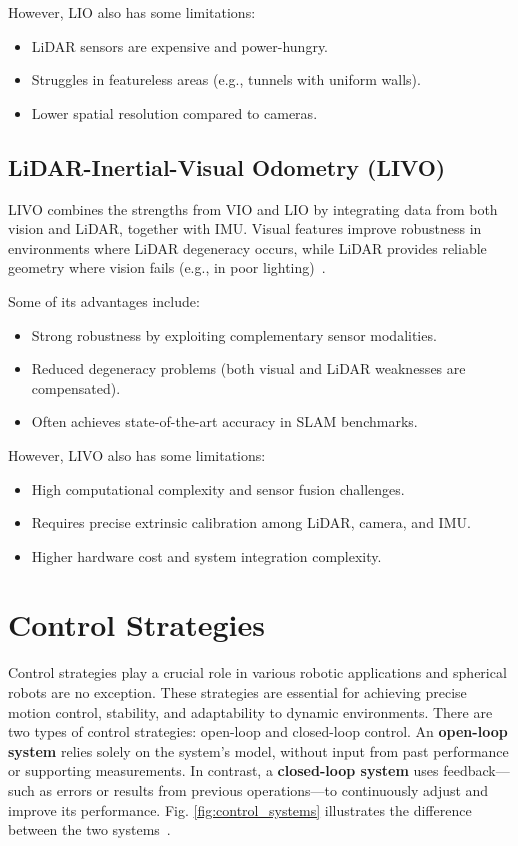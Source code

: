 \documentclass[english, bachelor, utf8]{base/thesis_telematics}
\begin{document}
However, LIO also has some limitations:
\begin{itemize}
    \item LiDAR sensors are expensive and power-hungry.
    \item Struggles in featureless areas (e.g., tunnels with uniform walls).
    \item Lower spatial resolution compared to cameras.
\end{itemize}

\subsection{LiDAR-Inertial-Visual Odometry (LIVO)}
LIVO combines the strengths from VIO and LIO by integrating data from both vision and LiDAR, together with IMU.
Visual features improve robustness in environments where LiDAR degeneracy occurs, while LiDAR provides reliable geometry where vision fails (e.g., in poor lighting)~\cite{yuan2024sr,fastlivo2}.

Some of its advantages include:
\begin{itemize}
    \item Strong robustness by exploiting complementary sensor modalities.
    \item Reduced degeneracy problems (both visual and LiDAR weaknesses are compensated).
    \item Often achieves state-of-the-art accuracy in SLAM benchmarks.
\end{itemize}

However, LIVO also has some limitations:
\begin{itemize}
    \item High computational complexity and sensor fusion challenges.
    \item Requires precise extrinsic calibration among LiDAR, camera, and IMU.
    \item Higher hardware cost and system integration complexity.
\end{itemize}

\section{Control Strategies}
\label{sec:control-strategies}
Control strategies play a crucial role in various robotic applications and spherical robots are no exception.
These strategies are essential for achieving precise motion control, stability, and adaptability to dynamic environments.
There are two types of control strategies: open-loop and closed-loop control.
An \textbf{open-loop system} relies solely on the system's model, without input from past performance or supporting measurements. In contrast, a \textbf{closed-loop system} uses feedback---such as errors or results from previous operations---to continuously adjust and improve its performance. Fig. \ref{fig:control_systems} illustrates the difference between the two systems~\cite{feedbackBook,vectornav_math_controls}.
\end{document}
